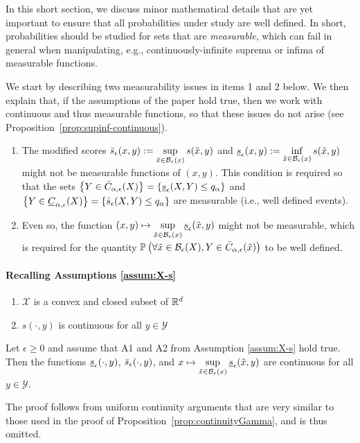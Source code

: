 \label{sec:measurability}

In this short section, we discuss minor mathematical details that are yet important to ensure that all probabilities under study are well defined. In short, probabilities should be studied for sets that are \emph{measurable}, which can fail in general when manipulating, e.g., continuously-infinite suprema or infima of measurable functions.

We start by describing two measurability issues in items 1 and 2 below. We then explain that, if the assumptions of the paper hold true, then we work with continuous and thus measurable functions, so that these issues do not arise (see Proposition~\ref{prop:supinf-continuous}).

\begin{enumerate}
    \item The modified scores $\Bar{s}_{\epsilon}(x,y) := \sup\limits_{\tilde{x}\in\mathcal{B}_\epsilon(x)} s(\tilde{x},y)$ and $\underline{s}_{\epsilon}(x,y):=\inf\limits_{\tilde{x}\in\mathcal{B}_\epsilon(x)} s(\tilde{x},y)$ might not be measurable functions of $(x,y)$. This condition is required so that the sets $\left\{ Y\in\Bar{C}_{\alpha, \epsilon}(X)\right\}=\left\{\underline{s}_{\epsilon}(X,Y)\leq q_\alpha \right\}$ and $\left\{ Y\in\underline{C}_{\alpha, \epsilon}(X)\right\}=\left\{\Bar{s}_{\epsilon}(X,Y)\leq q_\alpha \right\}$ are measurable (i.e., well defined events).
    \item Even so, the function $(x,y)\mapsto\sup\limits_{\tilde{x}\in\mathcal{B}_\epsilon(x)} \underline{s}_{\epsilon}(\tilde{x},y)$ might not be measurable, which is required for the quantity $\mathbb{P}\left(\forall \tilde{x} \in \mathcal{B}_\epsilon(X), Y\in \Bar{C}_{\alpha,\epsilon}(\tilde{x})\right)$ to be well defined.
\end{enumerate}

\paragraph{Recalling Assumptions \ref{assum:X-s}}
\begin{enumerate}[label=A\arabic*]
    \item $\mathcal{X}$ is a convex and closed subset of $\mathbb{R}^d$
    \item $s(\cdot, y)$ is continuous for all $y\in\mathcal{Y}$
\end{enumerate}

\begin{proposition}
\label{prop:supinf-continuous}
    Let $\epsilon\geq 0$ and assume that A1 and A2 from Assumption \ref{assum:X-s} hold true. Then the functions $\underline{s}_{\epsilon}(\cdot, y)$, $\Bar{s}_{\epsilon}(\cdot, y)$, and $x\mapsto\sup\limits_{\tilde{x}\in\mathcal{B}_\epsilon(x)} \underline{s}_{\epsilon}(\tilde{x},y)$ are continuous for all $y\in\mathcal{Y}$.
\end{proposition}

The proof follows from uniform continuity arguments that are very similar to those used in the proof of Proposition~\ref{prop:continuityGamma}, and is thus omitted.
